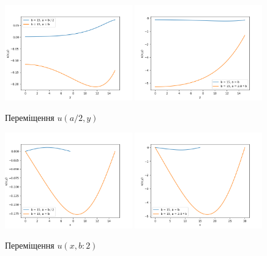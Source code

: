 \begin{figure}[h!]
    \begin{center}
        \includegraphics[width=0.49\textwidth, scale=1]{images/results/static_1/u(a:2,y)1.png}
        \includegraphics[width=0.49\textwidth, scale=1]{images/results/static_1/u(a:2,y)2.png}
        \caption{Переміщення $u(a/2, y)$}\label{static_1_u(a:2,y)}
    \end{center}
\end{figure}
\begin{figure}[h!]
    \begin{center}
        \includegraphics[width=0.49\textwidth, scale=1]{images/results/static_1/u(x,b:2)1.png}
        \includegraphics[width=0.49\textwidth, scale=1]{images/results/static_1/u(x,b:2)2.png}
        \caption{Переміщення $u(x, b:2)$}\label{static_1_u(x,b:2)}
    \end{center}
\end{figure}

